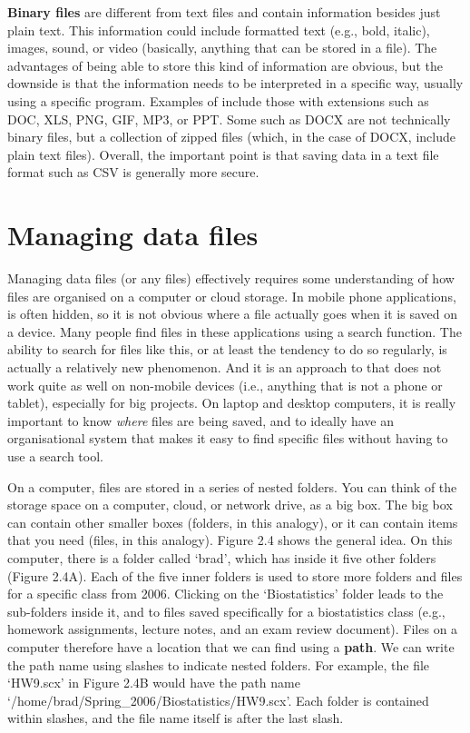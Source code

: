 \documentclass[
  openany]{krantz}
\begin{document}
\textbf{Binary files} are different from text files and contain information besides just plain text.
This information could include formatted text (e.g., bold, italic), images, sound, or video (basically, anything that can be stored in a file).
The advantages of being able to store this kind of information are obvious, but the downside is that the information needs to be interpreted in a specific way, usually using a specific program.
Examples of  include those with extensions such as DOC, XLS, PNG, GIF, MP3, or PPT.
Some  such as DOCX are not technically binary files, but a collection of zipped files (which, in the case of DOCX, include plain text files).
Overall, the important point is that saving data in a text file format such as CSV is generally more secure.

\hypertarget{managing-data-files}{%
\section{Managing data files}\label{managing-data-files}}

Managing data files (or any files) effectively requires some understanding of how files are organised on a computer or cloud storage.
In mobile phone applications,  is often hidden, so it is not obvious where a file actually goes when it is saved on a device.
Many people find files in these applications using a search function.
The ability to search for files like this, or at least the tendency to do so regularly, is actually a relatively new phenomenon.
And it is an approach to  that does not work quite as well on non-mobile devices (i.e., anything that is not a phone or tablet), especially for big projects.
On laptop and desktop computers, it is really important to know \emph{where} files are being saved, and to ideally have an organisational system that makes it easy to find specific files without having to use a search tool.

On a computer, files are stored in a series of nested folders.
You can think of the storage space on a computer, cloud, or network drive, as a big box.
The big box can contain other smaller boxes (folders, in this analogy), or it can contain items that you need (files, in this analogy).
Figure 2.4 shows the general idea.
On this computer, there is a folder called `brad', which has inside it five other folders (Figure 2.4A).
Each of the five inner folders is used to store more folders and files for a specific class from 2006.
Clicking on the `Biostatistics' folder leads to the sub-folders inside it, and to files saved specifically for a biostatistics class (e.g., homework assignments, lecture notes, and an exam review document).
Files on a computer therefore have a location that we can find using a  \textbf{path}.
We can write the path name using slashes to indicate nested folders.
For example, the file `HW9.scx' in Figure 2.4B would have the path name `/home/brad/Spring\_2006/Biostatistics/HW9.scx'.
Each folder is contained within slashes, and the file name itself is after the last slash.
\end{document}

